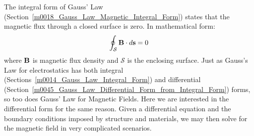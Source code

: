 


\label{m0047_Gauss_Law_Magnetic_Differential_from_Integral} %

The integral form of Gauss' Law (Section~\ref{m0018_Gauss_Law_Magnetic_Integral_Form}) states that the magnetic flux through a closed surface is zero.
In mathematical form:
%
\begin{equation}
\oint_{\mathcal S} {\bf B}\cdot d{\bf s} = 0
\label{m0047_eGLMIF}
\end{equation}
%
where ${\bf B}$ is magnetic flux density and ${\mathcal S}$ is the enclosing surface.
Just as Gauss's Law for electrostatics has both integral (Sections~\ref{m0014_Gauss_Law_Integral_Form}) and differential (Section~\ref{m0045_Gauss_Law_Differential_Form_from_Integral_Form}) forms, so too does Gauss' Law for Magnetic Fields.
Here we are interested in the differential form for the same reason.  Given a differential equation and the boundary conditions imposed by structure and materials, we may then solve for the magnetic field in very complicated scenarios.  

